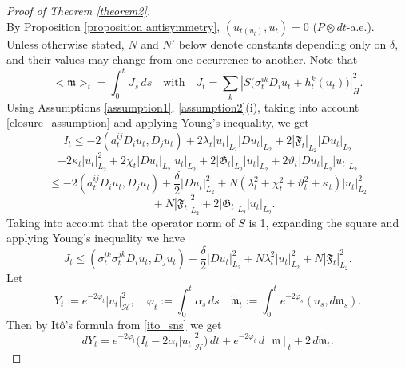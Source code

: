 \documentclass[11pt,reqno]{amsart}
\theoremstyle{definition}
\theoremstyle{remark}
\newcommand\frF{\mathfrak{F}}
\newcommand\frG{\mathfrak{G}}
\newcommand\frm{\mathfrak{m}}
\newcommand{\<}{\langle}
\renewcommand{\>}{\rangle}
\begin{document}
\begin{proof}[Proof of Theorem \ref{theorem2}]
$$$$
By Proposition \ref{proposition antisymmetry},
$(u_{t(u_t)},u_t)=0$
($P\otimes dt$-a.e.). 
Unless otherwise stated, $N$ and $N'$ below 
denote constants depending only on $\delta$, 
and their values may change from one occurrence to another. 
Note that 
\begin{equation}
                                                 \label{DM}
<\frm>_t=\int_0^tJ_s\,ds\quad  
\text{with}
\quad J_t=\sum_k|S\big(\sigma_t^{ik}D_i u_t+h_t^k(u_t)\big)|_H^2. 
\end{equation}
Using Assumptions \ref{assumption1},  
\ref{assumption2}(i), taking into account 
\eqref{closure_assumption} and applying Young's inequality, 
we get
$$
I_t\leq
-2(a_t^{ij}D_i u_t,D_j u_t)
+
2\lambda_t|u_t|_{L_2}|Du_t|_{L_2}
+
2|\frF_t|_{L_2}|Du_t|_{L_2}
$$
$$
+
2\kappa_t|u_t|_{L_2}^2
+
2\chi_t|Du_t|_{L_2}|u_t|_{L_2}
+
2|\frG_t|_{L_2}|u_t|_{L_2}
+
2\vartheta_t|Du_t|_{L_2}|u_t|_{L_2} 
$$
\begin{equation}
                                              \label{I_estimate}
\leq-2(a_t^{ij}D_i u_t,D_j u_t)
+
\frac{\delta}{2}|Du_t|_{L_2}^2
+
N(\lambda_t^2+\chi_t^2+\vartheta_t^2+\kappa_t)
|u_t|_{L_2}^2
\end{equation}
$$
\quad
+
N|\frF_t|_{L_2}^2
+
2|\frG_t|_{L_2}|u_t|_{L_2}.   
$$
 Taking into account that the operator norm of $S$ is 1, 
expanding the square and applying Young's inequality we have 
\begin{equation}
                                                   \label{J_estimate}
J_t\leq(\sigma_t^{ik}\sigma_t^{jk}D_i u_t,D_j u_t)
+
\frac{\delta}{2}|Du_t|_{L_2}^2+N\lambda_t^2|u_t|_{L_2}^2
+
N|\mathfrak{ F}_t|_{L_2}^2. 
\end{equation}
Let
$$
Y_t:=e^{-2\varphi_t}|u_t|_{\mathcal H}^2,
\quad
\varphi_t:=\int_0^t\alpha_s\,ds 
\quad 
\tilde{\frm}_t:=\int^{t}_{0}e^{-2\varphi_s}(u_s,d\frm_s) .
$$
Then by It\^o's formula from \eqref{ito_sns} we get   
\begin{equation}
                                       \label{application_ito}
dY_t
=
e^{-2\varphi_t}
\bigl(I_t-2\alpha_t|u_t|_{\mathcal H}^2\bigr)\,dt
+
e^{-2\varphi_t}\,d[\frm]_t
+
2\,d\tilde{\frm}_t .
\end{equation}


\end{proof}
\end{document}
